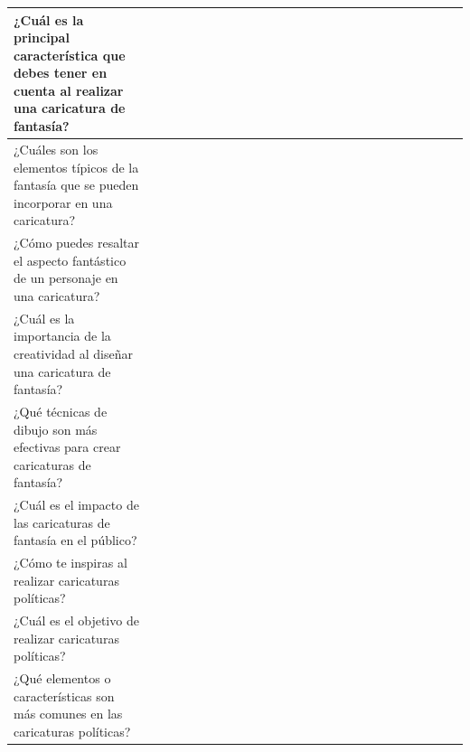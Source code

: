 \documentclass[12pt,a4paper]{article}
\begin{document}
\begin{landscape}
\begin{table}[ht!]
\begin{tabular}{llllllllllllllllllllllllll}
			¿Cuál es la principal característica que debes tener en cuenta al realizar una caricatura de fantasía? &                                          &    &    &    &    &    &    &    &    &     &     &     &     &     &     &     &     &     &     &     &           \\\hline
			¿Cuáles son los elementos típicos de la fantasía que se pueden incorporar en una caricatura?           &                                          &    &    &    &    &    &    &    &    &     &     &     &     &     &     &     &     &     &     &     &           \\\hline
			¿Cómo puedes resaltar el aspecto fantástico de un personaje en una caricatura?                         &                                          &    &    &    &    &    &    &    &    &     &     &     &     &     &     &     &     &     &     &     &           \\\hline
			¿Cuál es la importancia de la creatividad al diseñar una caricatura de fantasía?                       &                                          &    &    &    &    &    &    &    &    &     &     &     &     &     &     &     &     &     &     &     &           \\\hline
			¿Qué técnicas de dibujo son más efectivas para crear caricaturas de fantasía?                          &                                          &    &    &    &    &    &    &    &    &     &     &     &     &     &     &     &     &     &     &     &           \\\hline
			¿Cuál es el impacto de las caricaturas de fantasía en el público?                                      &                                          &    &    &    &    &    &    &    &    &     &     &     &     &     &     &     &     &     &     &     &           \\\hline
			¿Cómo te inspiras al realizar caricaturas políticas?                                                   &                                          &    &    &    &    &    &    &    &    &     &     &     &     &     &     &     &     &     &     &     &           \\\hline
			¿Cuál es el objetivo de realizar caricaturas políticas?                                                &                                          &    &    &    &    &    &    &    &    &     &     &     &     &     &     &     &     &     &     &     &           \\\hline
			¿Qué elementos o características son más comunes en las caricaturas políticas?                         &                                          &    &    &    &    &    &    &    &    &     &     &     &     &     &     &     &     &     &     &     &           \\\hline

\end{tabular}
\end{table}
\end{landscape}
\end{document}
